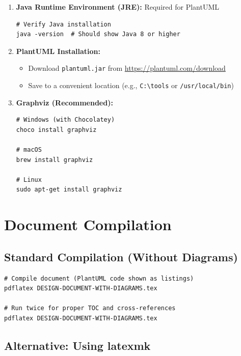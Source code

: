 \documentclass[12pt,a4paper]{report}
\begin{document}
\begin{enumerate}
    \item \textbf{Java Runtime Environment (JRE):} Required for PlantUML
    \begin{lstlisting}[style=bashStyle]
# Verify Java installation
java -version  # Should show Java 8 or higher
    \end{lstlisting}
    
    \item \textbf{PlantUML Installation:}
    \begin{itemize}
        \item Download \texttt{plantuml.jar} from \url{https://plantuml.com/download}
        \item Save to a convenient location (e.g., \texttt{C:\textbackslash tools} or \texttt{/usr/local/bin})
    \end{itemize}
    
    \item \textbf{Graphviz (Recommended):}
    \begin{lstlisting}[style=bashStyle]
# Windows (with Chocolatey)
choco install graphviz

# macOS
brew install graphviz

# Linux
sudo apt-get install graphviz
    \end{lstlisting}
\end{enumerate}

\section{Document Compilation}

\subsection{Standard Compilation (Without Diagrams)}

\begin{lstlisting}[style=bashStyle]
# Compile document (PlantUML code shown as listings)
pdflatex DESIGN-DOCUMENT-WITH-DIAGRAMS.tex

# Run twice for proper TOC and cross-references  
pdflatex DESIGN-DOCUMENT-WITH-DIAGRAMS.tex
\end{lstlisting}

\subsection{Alternative: Using latexmk}
\end{document}
